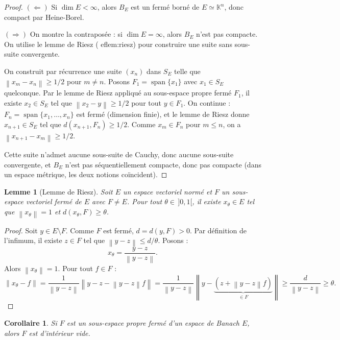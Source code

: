 \documentclass[a4paper,12pt]{book}
\DeclareMathOperator{\spn}{span}
\newcommand{\K}{\mathbb{K}}
\newcommand{\norm}[1]{\left\| #1 \right\|}
\theoremstyle{definition}
\theoremstyle{plain}
\newtheorem{lemme}[definition]{Lemme}
\newtheorem{corollaire}[definition]{Corollaire}
\theoremstyle{remark}
\begin{document}
\begin{proof}
$(\Leftarrow)$ Si $\dim E < \infty$, alors $B_E$ est un fermé borné de $E \simeq \K^n$, donc compact par Heine-Borel.

$(\Rightarrow)$ On montre la contraposée : si $\dim E = \infty$, alors $B_E$ n'est pas compacte. On utilise le lemme de Riesz (
ef{lem:riesz}) pour construire une suite sans sous-suite convergente.

On construit par récurrence une suite $(x_n)$ dans $S_E$ telle que $\norm{x_m - x_n} \geq 1/2$ pour $m \neq n$. Posons $F_1 = \spn\{x_1\}$ avec $x_1 \in S_E$ quelconque. Par le lemme de Riesz appliqué au sous-espace propre fermé $F_1$, il existe $x_2 \in S_E$ tel que $\norm{x_2 - y} \geq 1/2$ pour tout $y \in F_1$. On continue : $F_n = \spn\{x_1, \ldots, x_n\}$ est fermé (dimension finie), et le lemme de Riesz donne $x_{n+1} \in S_E$ tel que $d(x_{n+1}, F_n) \geq 1/2$. Comme $x_m \in F_n$ pour $m \leq n$, on a $\norm{x_{n+1} - x_m} \geq 1/2$.

Cette suite n'admet aucune sous-suite de Cauchy, donc aucune sous-suite convergente, et $B_E$ n'est pas séquentiellement compacte, donc pas compacte (dans un espace métrique, les deux notions coïncident).
\end{proof}

\begin{lemme}[Lemme de Riesz]\label{lem:riesz}
Soit $E$ un espace vectoriel normé et $F$ un sous-espace vectoriel fermé de $E$ avec $F \neq E$. Pour tout $\theta \in \,]0, 1[$, il existe $x_\theta \in E$ tel que $\norm{x_\theta} = 1$ et $d(x_\theta, F) \geq \theta$.
\end{lemme}

\begin{proof}
Soit $y \in E \setminus F$. Comme $F$ est fermé, $d = d(y, F) > 0$. Par définition de l'infimum, il existe $z \in F$ tel que $\norm{y - z} \leq d/\theta$. Posons :
\[
    x_\theta = \frac{y - z}{\norm{y - z}}.
\]
Alors $\norm{x_\theta} = 1$. Pour tout $f \in F$ :
\[
    \norm{x_\theta - f} = \frac{1}{\norm{y - z}} \norm{y - z - \norm{y-z} f} = \frac{1}{\norm{y-z}} \norm{y - \underbrace{(z + \norm{y-z}f)}_{\in F}} \geq \frac{d}{\norm{y-z}} \geq \theta.
\]
\end{proof}

\begin{corollaire}\label{cor:sous-espace-propre}
Si $F$ est un sous-espace propre fermé d'un espace de Banach $E$, alors $F$ est d'intérieur vide.
\end{corollaire}
\end{document}
